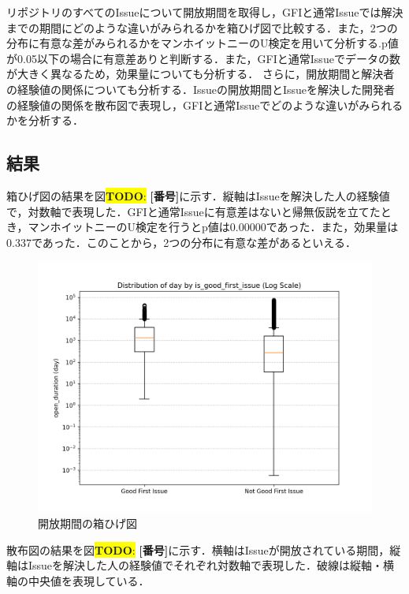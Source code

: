 \documentclass[11pt]{jreport}
\newcommand{\todo}[1]{\colorbox{yellow}{{\bf TODO}:}{\color{red} {\textbf{[#1]}}}}
\begin{document}
リポジトリのすべてのIssueについて開放期間を取得し，GFIと通常Issueでは解決までの期間にどのような違いがみられるかを箱ひげ図で比較する．また，2つの分布に有意な差がみられるかをマンホイットニーのU検定を用いて分析する.p値が0.05以下の場合に有意差ありと判断する．また，GFIと通常Issueでデータの数が大きく異なるため，効果量についても分析する．
さらに，開放期間と解決者の経験値の関係についても分析する．Issueの開放期間とIssueを解決した開発者の経験値の関係を散布図で表現し，GFIと通常Issueでどのような違いがみられるかを分析する．

\subsection{結果}
箱ひげ図の結果を図\todo{番号}に示す．縦軸はIssueを解決した人の経験値で，対数軸で表現した．GFIと通常Issueに有意差はないと帰無仮説を立てたとき，マンホイットニーのU検定を行うとp値は0.00000であった．また，効果量は0.337であった．このことから，2つの分布に有意な差があるといえる．

\begin{figure}[t]
\centerline{\includegraphics[width=0.9\linewidth]{@BSthesis2024_Nakai/BSthesis2024_Nakai_fig/time_box.png}}
\caption{開放期間の箱ひげ図}
\label{fig:milestone}
\end{figure}

散布図の結果を図\todo{番号}に示す．横軸はIssueが開放されている期間，縦軸はIssueを解決した人の経験値でそれぞれ対数軸で表現した．破線は縦軸・横軸の中央値を表現している．
\end{document}

